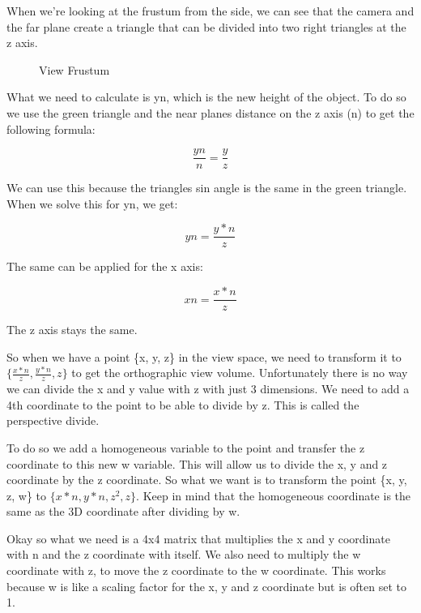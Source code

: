 \documentclass[12pt]{report} \usepackage{preamble}
\begin{document}
When we're looking at the frustum from the side, we can see that the camera and
the far plane create a triangle that can be divided into two right triangles at the
z axis.

\begin{figure}[hbtp]
	\centering 
	\caption{View Frustum}
\end{figure} \FloatBarrier

What we need to calculate is yn, which is the new height of the object.
To do so we use the green triangle and the near planes distance on the z axis
(n) to get the following formula:

\[
	\frac{yn}{n} = \frac{y}{z}
\]

We can use this because the triangles sin angle is the same in the green triangle.
When we solve this for yn, we get:

\[
	yn = \frac{y * n}{z}
\]

The same can be applied for the x axis:

\[
	xn = \frac{x * n}{z}
\]

The z axis stays the same.

So when we have a point \{x, y, z\} in the view space, we need to transform it to \\
\(\{\frac{x * n}{z}, \frac{y * n}{z}, z\}\) to get the orthographic view volume. Unfortunately
there is no way we can divide the x and y value with z with just 3 dimensions. We need to add a 4th coordinate to the point to be able to
divide by z. This is called the perspective divide.

To do so we add a homogeneous variable to the point and transfer the z coordinate to this new w
variable. This will allow us to divide the x, y and z coordinate by the z coordinate.
So what we want is to transform the point \{x, y, z, w\} to \(\{x * n, y * n, z^2, z\}\).
Keep in mind that the homogeneous coordinate is the same as the 3D coordinate after dividing by w.

Okay so what we need is a 4x4 matrix that multiplies the x and y coordinate with n and the z coordinate with itself.
We also need to multiply the w coordinate with z, to move the z coordinate to the w coordinate. This works because
w is like a scaling factor for the x, y and z coordinate but is often set to 1.
\end{document}
